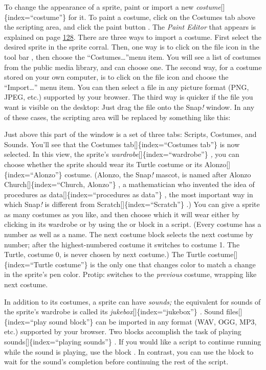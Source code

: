 \documentclass[
  letterpaper,
]{book}
\begin{document}
To change the appearance of a sprite, paint or import a new
\emph{costume}{[}{]}\{index=``costume''\} for it. To paint a costume,
click on the Costumes tab above the scripting area, and click the paint
button . The \emph{Paint Editor} that appears is explained on page
\hyperref[the-paint-editor]{128}. There are three ways to import a
costume. First select the desired sprite in the sprite corral. Then, one
way is to click on the file icon in the tool bar , then choose the
``Costumes\ldots{}''menu item. You will see a list of costumes from the
public media library, and can choose one. The second way, for a costume
stored on your own computer, is to click on the file icon and choose the
``Import\ldots{}'' menu item. You can then select a file in any picture
format (PNG, JPEG, etc.) supported by your browser. The third way is
quicker if the file you want is visible on the desktop: Just drag the
file onto the Snap\emph{!} window. In any of these cases, the scripting
area will be replaced by something like this:

Just above this part of the window is a set of three tabs: Scripts,
Costumes, and Sounds. You'll see that the Costumes
tab{[}{]}\{index=``Costumes tab''\} is now selected. In this view, the
sprite's \emph{wardrobe}{[}{]}\{index=``wardrobe''\} \emph{,} you can
choose whether the sprite should wear its Turtle costume or its
Alonzo{[}{]}\{index=``Alonzo''\} costume. (Alonzo, the Snap\emph{!}
mascot, is named after Alonzo Church{[}{]}\{index=``Church, Alonzo''\} ,
a mathematician who invented the idea of procedures as
data{[}{]}\{index=``procedures as data''\} , the most important way in
which Snap\emph{!} is different from Scratch{[}{]}\{index=``Scratch''\}
.) You can give a sprite as many costumes as you like, and then choose
which it will wear either by clicking in its wardrobe or by using the or
block in a script. (Every costume has a number as well as a name. The
next costume block selects the next costume by number; after the
highest-numbered costume it switches to costume 1. The Turtle, costume
0, is never chosen by next costume.) The Turtle
costume{[}{]}\{index=``Turtle costume''\} is the only one that changes
color to match a change in the sprite's pen color. Protip: switches to
the \emph{previous} costume, wrapping like next costume.

In addition to its costumes, a sprite can have \emph{sounds;} the
equivalent for sounds of the sprite's wardrobe is called its
\emph{jukebox}{[}{]}\{index=``jukebox''\} \emph{.} Sound
files{[}{]}\{index=``play sound block''\} can be imported in any format
(WAV, OGG, MP3, etc.) supported by your browser. Two blocks accomplish
the task of playing sounds{[}{]}\{index=``playing sounds''\} . If you
would like a script to continue running while the sound is playing, use
the block . In contrast, you can use the block to wait for the sound's
completion before continuing the rest of the script\emph{.}
\end{document}
